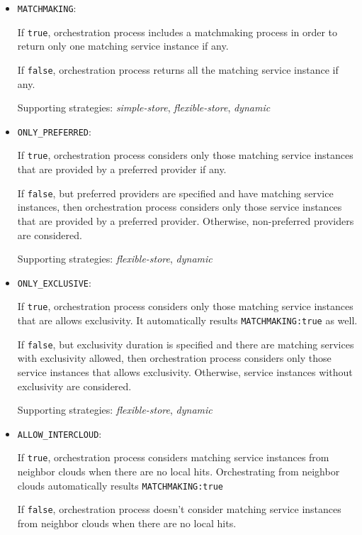 \documentclass[a4paper]{arrowhead}
\begin{document}
\begin{itemize}
    \item \texttt{MATCHMAKING}:
    
    If \texttt{true}, orchestration process includes a matchmaking process in order to return only one matching service instance if any. 

    If \texttt{false}, orchestration process returns all the matching service instance if any. 

    Supporting strategies: \textit{simple-store}, \textit{flexible-store}, \textit{dynamic}
    
    \item \texttt{ONLY\_PREFERRED}:

    If \texttt{true}, orchestration process considers only those matching service instances that are provided by a preferred provider if any.

    If \texttt{false}, but preferred providers are specified and have matching service instances, then orchestration process considers only those service instances that are provided by a preferred provider. Otherwise, non-preferred providers are considered.

    Supporting strategies: \textit{flexible-store}, \textit{dynamic}
    
    \item \texttt{ONLY\_EXCLUSIVE}:

    If \texttt{true}, orchestration process considers only those matching service instances that are allows exclusivity. It automatically results \texttt{MATCHMAKING:true} as well.

    If \texttt{false}, but exclusivity duration is specified and there are matching services with exclusivity allowed, then orchestration process considers only those service instances that allows exclusivity. Otherwise, service instances without exclusivity are considered.

    Supporting strategies: \textit{flexible-store}, \textit{dynamic}
    
    \item \texttt{ALLOW\_INTERCLOUD}:

    If \texttt{true}, orchestration process considers matching service instances from neighbor clouds when there are no local hits. Orchestrating from neighbor clouds automatically results \texttt{MATCHMAKING:true}

    If \texttt{false}, orchestration process doesn't consider matching service instances from neighbor clouds when there are no local hits.


\end{itemize}
\end{document}
